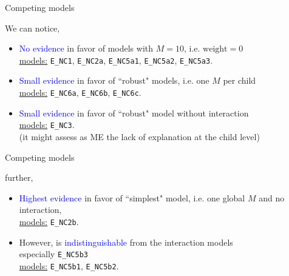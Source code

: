 \begin{comment}
					\node at (0.2,-0.25) {$(-)$}; %
					\draw[dotted, thick] (1.5,1) rectangle (3.5,-1);
					\draw[dashed] (-2.5,2) rectangle (3.7,-1.2);
				\end{tikzpicture}
				\caption*{(a) direct effects}
			\end{figure}
		\end{column}
	\end{columns}
\end{frame}
\end{comment}
%
%
\begin{lhframe}[rhgraphic={\texttt{[image: models\_table.png]}}]
	{Competing models}
	
	We can notice,
	\begin{itemize}
		\item \textcolor{blue}{No evidence} in favor of models with $M=10$, i.e. $\text{weight}=0$ \\
		\underline{models:} \texttt{E\_NC1}, \texttt{E\_NC2a}, \texttt{E\_NC5a1}, \texttt{E\_NC5a2}, \texttt{E\_NC5a3}. 
		\item \textcolor{blue}{Small evidence} in favor of ``robust" models, i.e. one $M$ per child \\
		\underline{models:} \texttt{E\_NC6a}, \texttt{E\_NC6b}, \texttt{E\_NC6c}. 
		\item \textcolor{blue}{Small evidence} in favor of ``robust" model without interaction \\
		\underline{models:} \texttt{E\_NC3}. \\
		{\small (it might assess as ME the lack of explanation at the child level)} \\
	\end{itemize}
\end{lhframe}
%
%
\begin{lhframe}[rhgraphic={\texttt{[image: models\_table.png]}}]
	{Competing models}
	
	further,
	\begin{itemize}
		\item \textcolor{blue}{Highest evidence} in favor of ``simplest" model, i.e. one global $M$ and no interaction, \\
		\underline{models:} \texttt{E\_NC2b}.
		\item However, is \textcolor{blue}{indistinguishable} from the interaction models \\
		especially \texttt{E\_NC5b3} \\ 
		\underline{models:} \texttt{E\_NC5b1}, \texttt{E\_NC5b2}.
	\end{itemize}
\end{lhframe}
